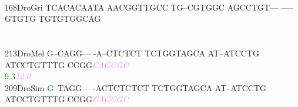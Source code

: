 \documentclass[11pt,twoside,reqno,a4paper]{article}
\begin{document}
{\hspace*{4\charwidth}\hspace*{7\charwidth}\hspace*{1\charwidth}\hspace*{1\charwidth}\hspace*{1\charwidth}\hspace*{1\charwidth}\hspace*{1\charwidth}\hspace*{1\charwidth}\\
168\hspace*{1\charwidth}DroGri	TCACACAATA	AACGGTTGCC	TG--CGTGGC	AGCCTGT---	-----GTGTG	TGTGTGGCAG	\\
\hspace*{4\charwidth}\hspace*{7\charwidth}\hspace*{1\charwidth}\hspace*{1\charwidth}\hspace*{1\charwidth}\hspace*{1\charwidth}\hspace*{1\charwidth}\hspace*{1\charwidth}\\
\\
213\hspace*{1\charwidth}DroMel	\textcolor{green}{G}--CAGG---	-A--CTCTCT	TCTGGTAGCA	AT--ATCCTG	ATCCTGTTTG	CCGG\textit{\textcolor{violet}{C}}\textit{\textcolor{violet}{A}}\textit{\textcolor{violet}{G}}\textit{\textcolor{violet}{C}}\textit{\textcolor{violet}{G}}\textit{\textcolor{violet}{C}}	\\
\hspace*{4\charwidth}\hspace*{7\charwidth}\hspace*{0\charwidth}\textcolor{green}{9.3}\hspace*{1\charwidth}\hspace*{1\charwidth}\hspace*{1\charwidth}\hspace*{1\charwidth}\hspace*{1\charwidth}\hspace*{51\charwidth}\textit{\textcolor{violet}{12.0}}\hspace*{1\charwidth}\\
209\hspace*{1\charwidth}DroSim	\textcolor{green}{G}--TAGG---	-ACTCTCTCT	TCTGGTAGCA	AT--ATCCTG	ATCCTGTTTG	CCGG\textit{\textcolor{violet}{C}}\textit{\textcolor{violet}{A}}\textit{\textcolor{violet}{G}}\textit{\textcolor{violet}{C}}\textit{\textcolor{violet}{G}}\textit{\textcolor{violet}{C}}	\\
}
\end{document}
